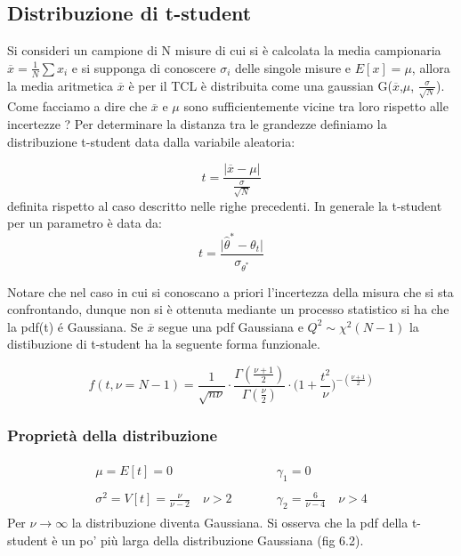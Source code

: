  \subsection{Distribuzione di t-student}
 Si consideri un campione di N misure di cui si \`{e} calcolata la media campionaria $\overline{x} = \frac{1}{N} \sum x_i$ e si supponga di conoscere $\sigma_i$ delle singole misure e $E[x] = \mu$, allora la media aritmetica $\overline{x}$ \`{e} per il TCL \`{e} distribuita come una gaussian G($\overline{x}$,$\mu$, $\frac{\sigma}{\sqrt{N}}$). Come facciamo a dire che $\overline{x}$ e ${\mu}$ sono sufficientemente vicine tra loro rispetto alle incertezze ?
 \newline
 Per determinare la distanza tra le grandezze definiamo la distribuzione t-student data dalla variabile aleatoria:
 
 \begin{equation*}
 	t = \dfrac{\vert \overline{x} - \mu\vert }{\frac{\sigma}{\sqrt{N}}}
 \end{equation*}
 definita rispetto al caso descritto nelle righe precedenti. In generale la t-student per un parametro \`{e} data da:
 \begin{equation}
 	t = \dfrac{\vert \hat{\theta}^* - \theta_t \vert}{\sigma_{\theta^*}}
 \end{equation}
 
 Notare che nel caso in cui si conoscano a priori l'incertezza della misura che si sta confrontando, dunque non si \`{e} ottenuta mediante un processo statistico si ha che la pdf(t) \'{e} Gaussiana.
 Se $\overline{x}$ segue una pdf Gaussiana e $Q^2 \sim \chi^2(N-1)$ la distibuzione di t-student ha la seguente forma funzionale.
 
 \begin{equation}
 	f(t,\nu = N-1) = \dfrac{1}{\sqrt{n\nu}} \cdot \dfrac{\Gamma({\frac{\nu+1}{2}})}{\Gamma(\frac{\nu}{2})} \cdot \Big (1 + \frac{t^2}{\nu} \Big) ^{-(\frac{\nu+1}{2})}
 \end{equation}
 
 \subsubsection{Propriet\`{a} della distribuzione}
 \begin{align*}
 	\begin{matrix}
 		\mu = E[t] = 0 & \quad \quad & \gamma_1 = 0 \\
 		\\
 		\sigma^2 = V[t] = \frac{\nu}{\nu-2} \quad \nu > 2 & \quad \quad & \gamma_2 = \frac{6}{\nu-4} \quad \nu > 4
 	\end{matrix}	
 \end{align*}
 \newline
 Per $\nu \rightarrow \infty$ la distribuzione diventa Gaussiana. Si osserva che la pdf della t-student \`{e} un po' pi\`{u} larga della distribuzione Gaussiana (fig 6.2).
 
